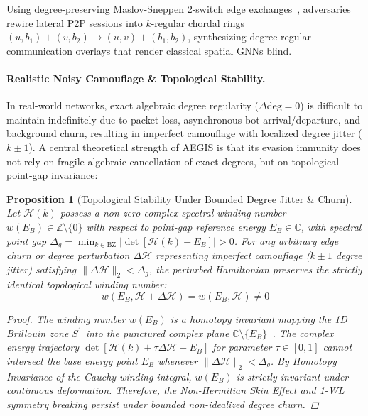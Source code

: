 \documentclass[10pt,twocolumn,letterpaper]{article}
\newtheorem{proposition}{Proposition}
\begin{document}
Using degree-preserving Maslov-Sneppen 2-switch edge exchanges~\cite{maslov2002specificity}, adversaries rewire lateral P2P sessions into $k$-regular chordal rings $(u, b_1) + (v, b_2) \to (u, v) + (b_1, b_2)$, synthesizing degree-regular communication overlays that render classical spatial GNNs blind.

\paragraph{Realistic Noisy Camouflage \& Topological Stability.}
In real-world networks, exact algebraic degree regularity ($\Delta \mathrm{deg} = 0$) is difficult to maintain indefinitely due to packet loss, asynchronous bot arrival/departure, and background churn, resulting in imperfect camouflage with localized degree jitter ($k \pm 1$). A central theoretical strength of AEGIS is that its evasion immunity does not rely on fragile algebraic cancellation of exact degrees, but on topological point-gap invariance:

\begin{proposition}[Topological Stability Under Bounded Degree Jitter \& Churn]
\label{prop:topological_stability}
Let $\mathcal{H}(k)$ possess a non-zero complex spectral winding number $w(E_B) \in \mathbb{Z} \setminus \{0\}$ with respect to point-gap reference energy $E_B \in \mathbb{C}$, with spectral point gap $\Delta_g = \min_{k \in \mathrm{BZ}} |\det[\mathcal{H}(k) - E_B]| > 0$. For any arbitrary edge churn or degree perturbation $\Delta \mathcal{H}$ representing imperfect camouflage ($k \pm 1$ degree jitter) satisfying $\|\Delta \mathcal{H}\|_2 < \Delta_g$, the perturbed Hamiltonian preserves the strictly identical topological winding number:
\begin{equation}
w(E_B, \mathcal{H} + \Delta \mathcal{H}) = w(E_B, \mathcal{H}) \ne 0
\end{equation}
\begin{proof}
The winding number $w(E_B)$ is a homotopy invariant mapping the 1D Brillouin zone $S^1$ into the punctured complex plane $\mathbb{C} \setminus \{E_B\}$~\cite{kawabata2019symmetry, ashida2020nonhermitian}. The complex energy trajectory $\det[\mathcal{H}(k) + \tau \Delta \mathcal{H} - E_B]$ for parameter $\tau \in [0, 1]$ cannot intersect the base energy point $E_B$ whenever $\|\Delta \mathcal{H}\|_2 < \Delta_g$. By Homotopy Invariance of the Cauchy winding integral, $w(E_B)$ is strictly invariant under continuous deformation. Therefore, the Non-Hermitian Skin Effect and 1-WL symmetry breaking persist under bounded non-idealized degree churn.
\end{proof}
\end{proposition}
\end{document}
